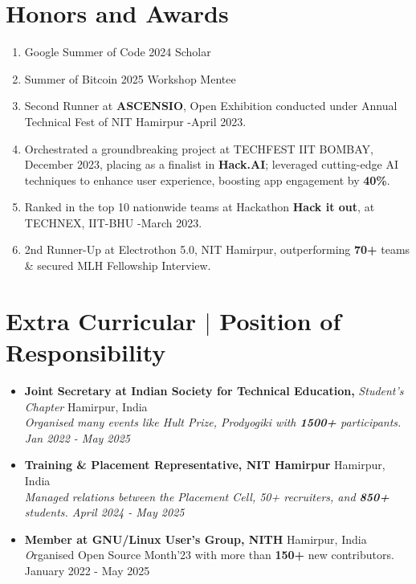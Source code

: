\documentclass[a4,10pt]{article}
\begin{document}
\section{Honors and Awards}
\begin{enumerate}[leftmargin=*, itemsep=0em]
    \item Google Summer of Code 2024 Scholar
    \item Summer of Bitcoin 2025 Workshop Mentee
    \item Second Runner at \textbf{ASCENSIO}, Open Exhibition conducted under Annual Technical Fest of NIT Hamirpur -April 2023.
    \item Orchestrated a groundbreaking project at TECHFEST IIT BOMBAY, December 2023, placing as a finalist in \textbf{Hack.AI}; leveraged cutting-edge AI techniques to enhance user experience, boosting app engagement by \textbf{40\%}.
    \item Ranked in the top 10 nationwide teams at Hackathon \textbf{Hack it out}, at TECHNEX, IIT-BHU -March 2023.
    \item 2nd Runner-Up at Electrothon 5.0, NIT Hamirpur, outperforming \textbf{70+} teams \& secured MLH Fellowship Interview.
\end{enumerate}


\section{Extra Curricular $|$ \normalsize{Position of Responsibility}}

\begin{itemize}[leftmargin=*, itemsep=0em]
    \item \textbf {Joint Secretary at Indian Society for Technical Education,} \textit{Student's Chapter} \hfill Hamirpur, India\\
    \textit {Organised many events like Hult Prize, Prodyogiki with \textbf{1500+} participants. \hfill Jan 2022 - May 2025}
    
    \item \textbf {Training \& Placement Representative, NIT Hamirpur} \hfill Hamirpur, India\\
    \textit{ Managed relations between the Placement Cell, 50+ recruiters, and \textbf{850+} students. \hfill April 2024 - May 2025}
    
    \item \textbf{Member at GNU/Linux User's Group, NITH} \hfill Hamirpur, India\\
    \textit Organised Open Source Month'23 with more than \textbf{150+} new contributors. \hfill January 2022 - May 2025
\end{itemize}
\end{document}
